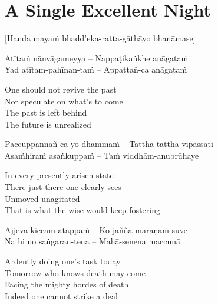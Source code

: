 
\section{A Single Excellent Night}
\label{single-excellent-night}

\begin{center}
  [Handa mayaṁ bhadd’eka-ratta-gāthāyo bhaṇāmase]
\end{center}

\begin{twochants}
  Atītaṁ nānvāgameyya – Nappaṭikaṅkhe anāgataṁ\\
  Yad atītam-pahīnan-taṁ – Appattañ-ca anāgataṁ\\
\end{twochants}

\begin{english}
  One should not revive the past\\
  Nor speculate on what’s to come\\
  The past is left behind\\
  The future is unrealized
\end{english}

\begin{twochants}
  Paccuppannañ-ca yo dhammaṁ – Tattha tattha vipassati\\
  Asaṁhiraṁ asaṅkuppaṁ – Taṁ viddhām-anubrūhaye\\
\end{twochants}

\begin{english}
  In every presently arisen state\\
  There just there one clearly sees\\
  Unmoved unagitated\\
  That is what the wise would keep fostering
\end{english}

\begin{twochants}
  Ajjeva kiccam-ātappaṁ – Ko jaññā maraṇaṁ suve\\
  Na hi no saṅgaran-tena – Mahā-senena maccunā\\
\end{twochants}

\begin{english}
  Ardently doing one’s task today\\
  Tomorrow who knows death may come\\
  Facing the mighty hordes of death\\
  Indeed one cannot strike a deal
\end{english}

